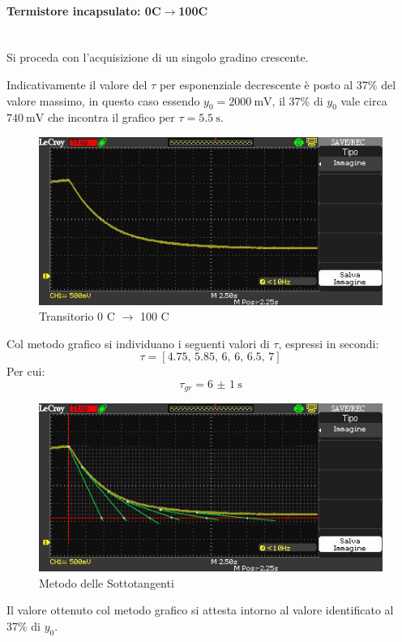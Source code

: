 \documentclass[a4paper, 12pt, twoside]{report}
\begin{document}
		\paragraph{Termistore incapsulato: 0\degree C$\rightarrow$100\degree C} \mbox{}\\
		Si proceda con l'acquisizione di un singolo gradino crescente. \newline 
		
		Indicativamente il valore del $\tau$ per esponenziale decrescente è posto al 37\% del valore massimo, in questo caso essendo $y_0 = \SI{2000}{\milli\volt}$, il 37\% di $y_0$ vale circa $\SI{740}{\milli\volt}$ che incontra il grafico per $\tau=\SI{5.5}{\second}$.		
		\begin{figure}[H]
			\centering
			\includegraphics[width=0.7\linewidth]{immaginioscillo/5}
			\caption{Transitorio 0 \degree C $\rightarrow$ 100 \degree C}
			\label{fig:9}
		\end{figure}				
		Col metodo grafico si individuano i seguenti valori di $\tau$, espressi in secondi:
		\[ \tau = [4.75,\, 5.85,\, 6,\, 6,\, 6.5,\, 7]\]
		Per cui:
		\[\tau_{gr} = \SI[separate-uncertainty = true]{6(1)}{\second}\]				
		\begin{figure}[H]
			\centering
			\includegraphics[width=0.7\linewidth]{immaginioscillo/5+}
			\caption{Metodo delle Sottotangenti}
			\label{fig:10}
		\end{figure}		
		Il valore ottenuto col metodo grafico si attesta intorno al valore identificato al 37\% di $y_0$.	
		
\newpage	
		
\end{document}
